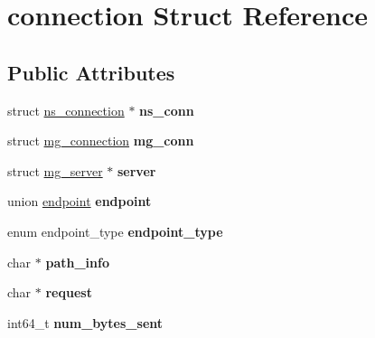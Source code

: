 \hypertarget{structconnection}{\section{connection Struct Reference}
\label{structconnection}
}
\subsection*{Public Attributes}
\begin{DoxyCompactItemize}
\item 
\hypertarget{structconnection_a33338c1069d70a271a5bafa5132698bb}{struct \hyperlink{structns__connection}{ns\-\_\-connection} $\ast$ {\bfseries ns\-\_\-conn}}\label{structconnection_a33338c1069d70a271a5bafa5132698bb}

\item 
\hypertarget{structconnection_acba5c9648d0ccaf436d9f3b1ca4e3663}{struct \hyperlink{structmg__connection}{mg\-\_\-connection} {\bfseries mg\-\_\-conn}}\label{structconnection_acba5c9648d0ccaf436d9f3b1ca4e3663}

\item 
\hypertarget{structconnection_a409f5c2e29f77b3be3fae4f06bc4f1f1}{struct \hyperlink{structmg__server}{mg\-\_\-server} $\ast$ {\bfseries server}}\label{structconnection_a409f5c2e29f77b3be3fae4f06bc4f1f1}

\item 
\hypertarget{structconnection_a61a295c4a3d7f32d0892c8d5b168b761}{union \hyperlink{unionendpoint}{endpoint} {\bfseries endpoint}}\label{structconnection_a61a295c4a3d7f32d0892c8d5b168b761}

\item 
\hypertarget{structconnection_ad5ceb60df6470084af97e10a2a07e9ba}{enum endpoint\-\_\-type {\bfseries endpoint\-\_\-type}}\label{structconnection_ad5ceb60df6470084af97e10a2a07e9ba}

\item 
\hypertarget{structconnection_ad0715458bffff8e5408ae7d16303be02}{char $\ast$ {\bfseries path\-\_\-info}}\label{structconnection_ad0715458bffff8e5408ae7d16303be02}

\item 
\hypertarget{structconnection_aa3be303ab148026058fd456a80040446}{char $\ast$ {\bfseries request}}\label{structconnection_aa3be303ab148026058fd456a80040446}

\item 
\hypertarget{structconnection_ae7bfe72a24ab795993c228c7bd58ace7}{int64\-\_\-t {\bfseries num\-\_\-bytes\-\_\-sent}}\label{structconnection_ae7bfe72a24ab795993c228c7bd58ace7}


\end{DoxyCompactItemize}
